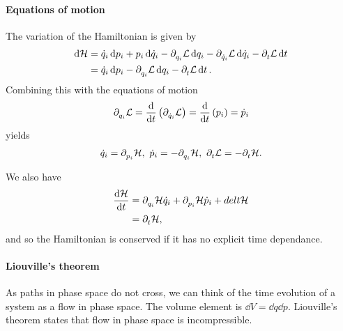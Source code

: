 \paragraph{Equations of motion}
The variation of the Hamiltonian is given by
\begin{align*}
	\dd{\mathcal{H}} &= \dot{q}_{i}\dd{p_{i}} + p_{i}\dd{\dot{q}_{i}} - \partial^{}_{q_{i}}\mathcal{L}\dd{q_{i}} - \partial^{}_{\dot{q}_{i}}\mathcal{L}\dd{\dot{q}_{i}} - \partial^{}_{t}\mathcal{L}\dd{t} \\
	          &= \dot{q}_{i}\dd{p_{i}} - \partial^{}_{q_{i}}\mathcal{L}\dd{q_{i}} - \partial^{}_{t}\mathcal{L}\dd{t}.
\end{align*}
Combining this with the equations of motion
\begin{align*}
	\partial^{}_{q_{i}}\mathcal{L} = \dv{t}\left(\partial^{}_{\dot{q}_{i}}\mathcal{L}\right) = \dv{t}\left(p_{i}\right) = \dot{p}_{i}
\end{align*}
yields
\begin{align*}
	\dot{q}_{i} = \del{p_{i}}{\ham},\ \dot{p}_{i} = -\del{q_{i}}{\ham},\ \del{t}{\lag} = -\del{t}{\ham}.
\end{align*}

We also have
\begin{align*}
	\dv{\mathcal{H}}{t} &= \partial^{}_{q_{i}}\mathcal{H}\dot{q}_{i} + \partial^{}_{p_{i}}\mathcal{H}\dot{p}_{i} + del{t}{\mathcal{H}} \\
	             &= \partial^{}_{t}\mathcal{H},
\end{align*}
and so the Hamiltonian is conserved if it has no explicit time dependance.

\paragraph{Liouville's theorem}
As paths in phase space do not cross, we can think of the time evolution of a system as a flow in phase space. The volume element is $\dd{V} = \dd{q}\dd{p}$. Liouville's theorem states that flow in phase space is incompressible.

